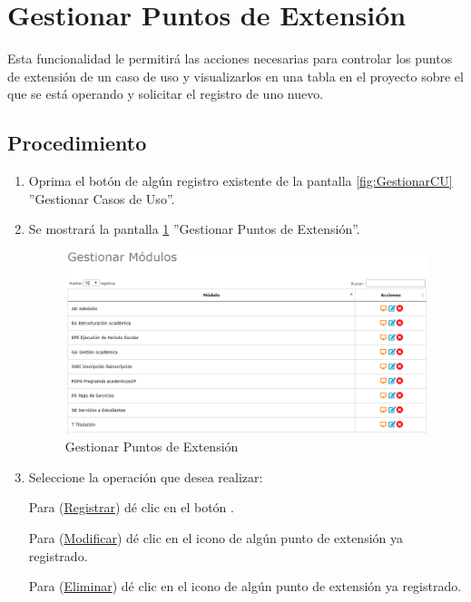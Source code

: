 \hypertarget{cv:GestionarPExt}{\section{Gestionar Puntos de Extensión}} \label{sec:GestionarPExt}

	Esta funcionalidad le permitirá las acciones necesarias para controlar los puntos de extensión de un caso de uso y visualizarlos en una tabla en el proyecto sobre el que se está operando y solicitar el registro de uno nuevo.

		\subsection{Procedimiento}

			\begin{enumerate}
			
			\item Oprima el botón \IUPext{} de algún registro existente de la pantalla \ref{fig:GestionarCU} ''Gestionar Casos de Uso''.
	
			\item Se mostrará la pantalla \ref{fig:GestionarPuntosExt} ''Gestionar Puntos de Extensión''.

			\begin{figure}[htbp!]
				\begin{center}
					\includegraphics[scale=0.6]{roles/lider/casosUso/pantallas/IU5gestionarModulos}
					\caption{Gestionar Puntos de Extensión}
					\label{fig:GestionarPuntosExt}
				\end{center}
			\end{figure}
		
				\item Seleccione la operación que desea realizar:
			
			Para (\hyperlink{cv:registrarPExt}{Registrar}) dé clic en el botón \IURegistrar.
			
			Para (\hyperlink{cv:modificarPExt}{Modificar}) dé clic en el icono \IUEditar{} de algún punto de extensión ya registrado.
			
			Para (\hyperlink{cv:eliminarPExt}{Eliminar}) dé clic en el icono \IUBotonEliminar{} de algún punto de extensión ya registrado.
			
			\end{enumerate}